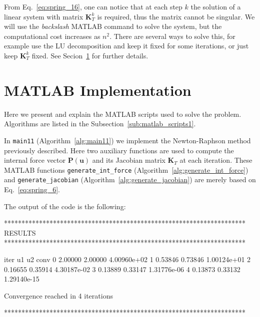 \smallskip

\begin{marker}
From Eq.~\eqref{eq:spring_16}, one can notice that at each step $k$ the solution of a linear system with matrix $\mathbf{K}_T^k$ is required, thus the matrix cannot be singular. We will use the \emph{backslash} MATLAB command to solve the system, but the computational cost increases as $n^2$. There are several ways to solve this, for example use the LU decomposition and keep it fixed for some iterations, or just keep $\mathbf{K}_T^k$ fixed. See Secion~\ref{sec:MATLAB_implementation1} for further details.
\end{marker}

\newpage

\section{MATLAB Implementation}
\label{sec:MATLAB_implementation1}%

Here we present and explain the MATLAB scripts used to solve the problem. Algorithms are listed in the Subsection~\ref{sub:matlab_scripts1}.

In \texttt{main11} (Algorithm~\ref{alg:main11}) we implement the Newton-Raphson method previously described. Here two auxiliary functions are used to compute the internal force vector $\mathbf{P}(\mathbf{u})$ and its Jacobian matrix $\mathbf{K}_T$ at each iteration. These MATLAB functions \newline
\texttt{generate\_int\_force} (Algorithm~\ref{alg:generate_int_force}) and \texttt{generate\_jacobian} (Algorithm~\ref{alg:generate_jacobian}) are merely based on Eq.~\eqref{eq:spring_6}.

The output of the code is the following:
\begin{matlaboutput}
*********************************************************************
RESULTS
*********************************************************************

iter   u1        u2        conv
   0   2.00000   2.00000   4.00960e+02
   1   0.53846   0.73846   1.00124e+01
   2   0.16655   0.35914   4.30187e-02
   3   0.13889   0.33147   1.31776e-06
   4   0.13873   0.33132   1.29140e-15

Convergence reached in 4 iterations

*********************************************************************
\end{matlaboutput}

